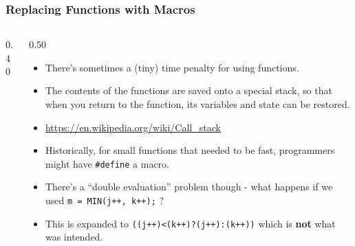 \begin{frame}[fragile]
\frametitle{Replacing Functions with Macros}
\begin{columns}

\begin{column}{0.40\textwidth}

\end{column}

\pause
\begin{column}{0.50\textwidth}
\begin{itemize}[<+->]
\item There's sometimes a (tiny) time penalty for using functions.
\item The contents of the functions are saved onto a special stack, so that when you return to the function, its variables and state can be restored.
\item \url{https://en.wikipedia.org/wiki/Call_stack}
\item Historically, for small functions that needed to be fast, programmers might have \verb^#define^ a macro.
\item There's a ``double evaluation'' problem though - what happens if we used {\tt m = MIN(j++, k++);} ?
\item This is expanded to {\tt ((j++)<(k++)?(j++):(k++))} which is {\bf not} what was intended.
\end{itemize}
\end{column}

\end{columns}
\end{frame}


